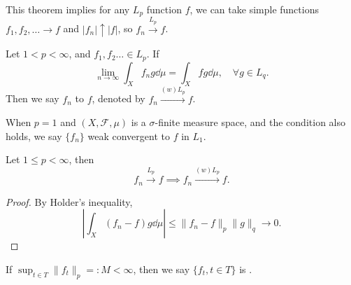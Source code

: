 \begin{remark}
	This theorem implies for any $L_p$ function $f$, we can take
	simple functions $f_1,f_2,\dots\to f$ and $|f_n|\uparrow |f|$,
	so $f_n\xrightarrow{L_p} f$.
\end{remark}

\begin{definition}
	Let $1<p<\infty$, and $f_1,f_2\dots\in L_p$. If
	\[
	\lim_{n\to \infty}\int_X f_n g\dd\mu = \int_X fg\dd \mu,\quad
	\forall g\in L_q.
	\]
	Then we say $f_n$  to $f$, denoted by
	$f_n \xrightarrow{(w)L_p} f$.

	When $p = 1$ and $(X, \mathscr{F}, \mu)$ is a $\sigma$-finite
	measure space, and the condition also holds,
	we say  $\{f_n\}$ weak convergent to $f$ in $L_1$.
\end{definition}

\begin{corollary}
    Let $1\le p < \infty$, then
	\[
		f_n \xrightarrow{L_p} f\implies f_n \xrightarrow{(w)L_p} f.
	\]
\end{corollary}
\begin{proof}[Proof]
    By Holder's inequality,
	\[
	\left| \int_X (f_n - f)g\dd \mu \right|\le \lVert f_n - f \rVert _p
	\lVert g \rVert _q \to 0.
	\]
\end{proof}

If $\sup_{t\in T} \lVert f_t \rVert _p =: M < \infty$,
then we say $\{f_t, t\in T\}$ is .


